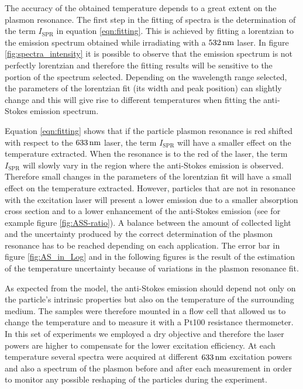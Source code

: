 The accuracy of the obtained temperature depends to a great extent on the
plasmon resonance. The first step in the fitting of spectra is the determination
of the term $I_\textrm{SPR}$ in equation \ref{eqn:fitting}. This is achieved by
fitting a lorentzian to the emission spectrum obtained while irradiating with a
$532\,\textrm{nm}$ laser. In figure \ref{fig:spectra_intensity} it is possible to observe that
the emission spectrum is not perfectly lorentzian and therefore the fitting
results will be sensitive to the portion of the spectrum selected. Depending on
the wavelength range selected, the parameters of the lorentzian fit (its
width and peak position) can slightly change and this will give rise to
different temperatures when fitting the anti-Stokes emission spectrum.

Equation \ref{eqn:fitting} shows that if the particle plasmon resonance is red
shifted with respect to the $633\,\textrm{nm}$ laser, the term $I_\textrm{SPR}$ will have
a smaller effect on the temperature extracted. When the resonance is to the red
of the laser, the term $I_\textrm{SPR}$ will slowly vary in the region where the
anti-Stokes emission is observed. Therefore small changes in the parameters of
the lorentzian fit will have a small effect on the temperature extracted.
However, particles that are not in resonance with the excitation laser will
present a lower emission due to a smaller absorption cross section and to a
lower enhancement of the anti-Stokes emission (see for example figure
\ref{fig:ASS-ratio}). A balance between the amount of collected light and the
uncertainty produced by the correct determination of the plasmon resonance has
to be reached depending on each application. The error bar in figure
\ref{fig:AS_in_Log} and in the following figures is the result of the estimation
of the temperature uncertainty because of variations in the plasmon resonance
fit.


As expected from the model, the anti-Stokes emission should depend not only on
the particle's intrinsic properties but also on the temperature of the
surrounding medium\cite{Konrad2013}. The samples were therefore mounted in a
flow cell that allowed us to change the temperature and to measure it with a
Pt100 resistance thermometer. In this set of experiments we employed a dry
objective and therefore the laser powers are higher to compensate for the lower
excitation efficiency. At each temperature several spectra were acquired at
different $633\,\textrm{nm}$ excitation powers and also a spectrum of the plasmon before
and after each measurement in order to monitor any possible reshaping of the
particles during the experiment.

